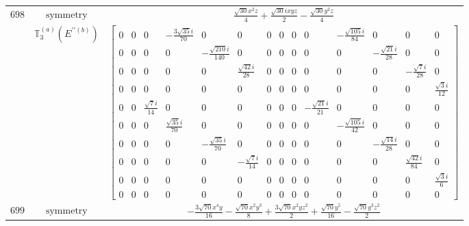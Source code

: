 \documentclass[fleqn,8pt,landscape]{jsarticle}
\begin{document}
\begin{longtable}{ccc}
$ 698 $ & $ \text{symmetry} $ & $ \frac{\sqrt{30} x^{2} z}{4} + \frac{\sqrt{30} i x y z}{2} - \frac{\sqrt{30} y^{2} z}{4} $ \\
$  $ & $ \mathbb{T}_{3}^{(a)}(E^{\prime\prime(b)}) $ & $ \begin{bmatrix} 0 & 0 & 0 & - \frac{3 \sqrt{35} i}{70} & 0 & 0 & 0 & 0 & 0 & 0 & - \frac{\sqrt{105} i}{84} & 0 & 0 & 0 \\ 0 & 0 & 0 & 0 & - \frac{\sqrt{210} i}{140} & 0 & 0 & 0 & 0 & 0 & 0 & - \frac{\sqrt{21} i}{28} & 0 & 0 \\ 0 & 0 & 0 & 0 & 0 & \frac{\sqrt{42} i}{28} & 0 & 0 & 0 & 0 & 0 & 0 & - \frac{\sqrt{7} i}{28} & 0 \\ 0 & 0 & 0 & 0 & 0 & 0 & 0 & 0 & 0 & 0 & 0 & 0 & 0 & \frac{\sqrt{3} i}{12} \\ 0 & 0 & \frac{\sqrt{7} i}{14} & 0 & 0 & 0 & 0 & 0 & 0 & - \frac{\sqrt{21} i}{21} & 0 & 0 & 0 & 0 \\ 0 & 0 & 0 & \frac{\sqrt{35} i}{70} & 0 & 0 & 0 & 0 & 0 & 0 & - \frac{\sqrt{105} i}{42} & 0 & 0 & 0 \\ 0 & 0 & 0 & 0 & - \frac{\sqrt{35} i}{70} & 0 & 0 & 0 & 0 & 0 & 0 & - \frac{\sqrt{14} i}{28} & 0 & 0 \\ 0 & 0 & 0 & 0 & 0 & - \frac{\sqrt{7} i}{14} & 0 & 0 & 0 & 0 & 0 & 0 & \frac{\sqrt{42} i}{84} & 0 \\ 0 & 0 & 0 & 0 & 0 & 0 & 0 & 0 & 0 & 0 & 0 & 0 & 0 & \frac{\sqrt{3} i}{6} \\ 0 & 0 & 0 & 0 & 0 & 0 & 0 & 0 & 0 & 0 & 0 & 0 & 0 & 0 \end{bmatrix} $ \\ \hline
$ 699 $ & $ \text{symmetry} $ & $ - \frac{3 \sqrt{70} x^{4} y}{16} - \frac{\sqrt{70} x^{2} y^{3}}{8} + \frac{3 \sqrt{70} x^{2} y z^{2}}{2} + \frac{\sqrt{70} y^{5}}{16} - \frac{\sqrt{70} y^{3} z^{2}}{2} $ \\

\end{longtable}
\end{document}
